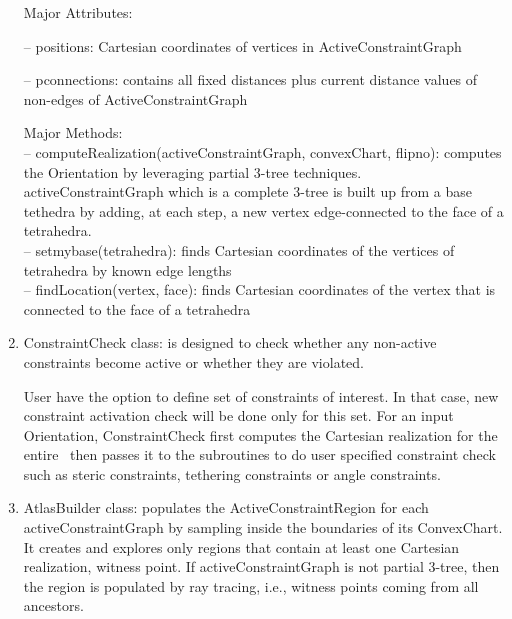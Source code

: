 \begin{enumerate}
\smallskip
Major Attributes:

\noindent --  \textsf{positions}: Cartesian coordinates of vertices in ActiveConstraintGraph

\noindent --  \textsf{pconnections}: contains all fixed distances plus current distance values of non-edges of ActiveConstraintGraph

\smallskip
Major Methods:\\
\smallskip
\noindent --  \textsf{computeRealization(activeConstraintGraph, convexChart, flipno)}: computes the Orientation by leveraging partial 3-tree techniques.
activeConstraintGraph which is a complete 3-tree is built up from a base tethedra by adding, at each step, a new vertex
edge-connected to the face of a tetrahedra.\\
\smallskip
\noindent --  \textsf{setmybase(tetrahedra)}:  finds Cartesian coordinates of the vertices of tetrahedra by known edge lengths \\
\smallskip
\noindent --  \textsf{findLocation(vertex, face)}: finds Cartesian coordinates of the vertex that is connected to the face of a tetrahedra\\

\item \textsf{ConstraintCheck} class: is designed to check whether any non-active constraints become active or whether they are violated.

User have the option to define set of constraints of interest. In that case, new constraint activation check will be done only for this set.
For an input Orientation, ConstraintCheck first computes the Cartesian realization for the entire \helix\ then passes it to the subroutines to do user specified constraint check such as steric constraints, tethering constraints or angle constraints.\\


\item \textsf{AtlasBuilder} class: populates the ActiveConstraintRegion for each activeConstraintGraph by sampling inside the boundaries of its ConvexChart.
It creates and explores only regions that contain at least one Cartesian realization, witness point.
If activeConstraintGraph is not partial 3-tree, then the region is populated by ray tracing, i.e., witness points coming from all ancestors.



\end{enumerate}
